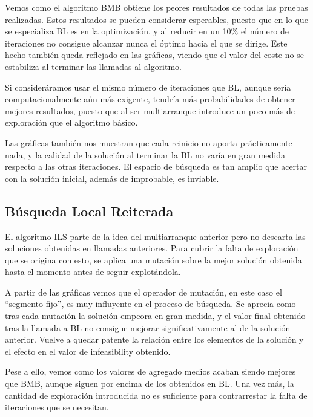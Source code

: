 Vemos como el algoritmo BMB obtiene los peores resultados de todas las pruebas realizadas. Estos resultados se pueden considerar esperables, puesto que en lo que se especializa BL es en la optimización, y al reducir en un 10\% el número de iteraciones no consigue alcanzar nunca el óptimo hacia el que se dirige. Este hecho también queda reflejado en las gráficas, viendo que el valor del coste no se estabiliza al terminar las llamadas al algoritmo.

Si consideráramos usar el mismo número de iteraciones que BL, aunque sería computacionalmente aún más exigente, tendría más probabilidades de obtener mejores resultados, puesto que al ser multiarranque introduce un poco más de exploración que el algoritmo básico.

\vspace{\baselineskip}

Las gráficas también nos muestran que cada reinicio no aporta prácticamente nada, y la calidad de la solución al terminar la BL no varía en gran medida respecto a las otras iteraciones. El espacio de búsqueda es tan amplio que acertar con la solución inicial, además de improbable, es inviable.

\subsection{Búsqueda Local Reiterada}

El algoritmo ILS parte de la idea del multiarranque anterior pero no descarta las soluciones obtenidas en llamadas anteriores. Para cubrir la falta de exploración que se origina con esto, se aplica una mutación sobre la mejor solución obtenida hasta el momento antes de seguir explotándola.

\vspace{\baselineskip}

A partir de las gráficas vemos que el operador de mutación, en este caso el ``segmento fijo'', es muy influyente en el proceso de búsqueda. Se aprecia como tras cada mutación la solución empeora en gran medida, y el valor final obtenido tras la llamada a BL no consigue mejorar significativamente al de la solución anterior. Vuelve a quedar patente la relación entre los elementos de la solución y el efecto en el valor de infeasibility obtenido.

Pese a ello, vemos como los valores de agregado medios acaban siendo mejores que BMB, aunque siguen por encima de los obtenidos en BL. Una vez más, la cantidad de exploración introducida no es suficiente para contrarrestar la falta de iteraciones que se necesitan.

